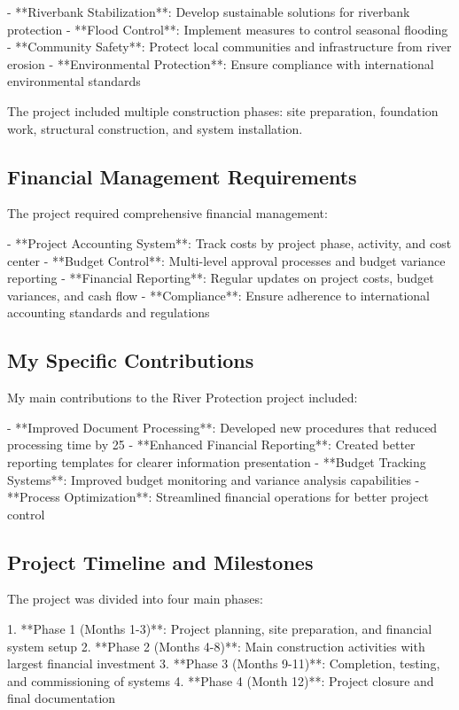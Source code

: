 - **Riverbank Stabilization**: Develop sustainable solutions for riverbank protection
- **Flood Control**: Implement measures to control seasonal flooding
- **Community Safety**: Protect local communities and infrastructure from river erosion
- **Environmental Protection**: Ensure compliance with international environmental standards

The project included multiple construction phases: site preparation, foundation work, structural construction, and system installation.

\subsection{Financial Management Requirements}
The project required comprehensive financial management:

- **Project Accounting System**: Track costs by project phase, activity, and cost center
- **Budget Control**: Multi-level approval processes and budget variance reporting
- **Financial Reporting**: Regular updates on project costs, budget variances, and cash flow
- **Compliance**: Ensure adherence to international accounting standards and regulations

\subsection{My Specific Contributions}
My main contributions to the River Protection project included:

- **Improved Document Processing**: Developed new procedures that reduced processing time by 25%
- **Enhanced Financial Reporting**: Created better reporting templates for clearer information presentation
- **Budget Tracking Systems**: Improved budget monitoring and variance analysis capabilities
- **Process Optimization**: Streamlined financial operations for better project control

\subsection{Project Timeline and Milestones}
The project was divided into four main phases:

1. **Phase 1 (Months 1-3)**: Project planning, site preparation, and financial system setup
2. **Phase 2 (Months 4-8)**: Main construction activities with largest financial investment
3. **Phase 3 (Months 9-11)**: Completion, testing, and commissioning of systems
4. **Phase 4 (Month 12)**: Project closure and final documentation

